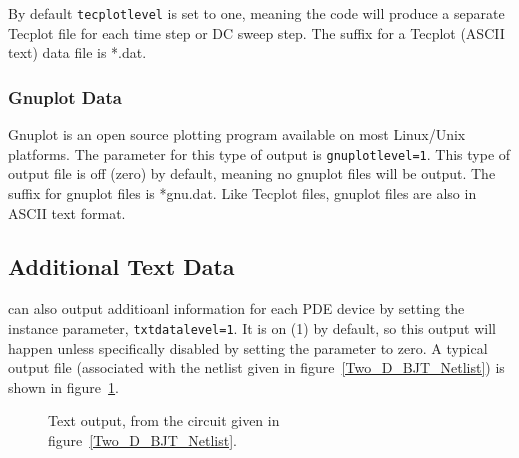 By default \texttt{tecplotlevel} is set to one, meaning the code will produce 
a separate Tecplot file for each time step or DC sweep step.   The
suffix for a Tecplot (ASCII text) data file is *.dat.

\subsubsection{Gnuplot Data}
Gnuplot is an open source plotting program available on most
Linux/Unix platforms.  The parameter for this type of output is 
\texttt{gnuplotlevel=1}.  This type of output file is off (zero) by 
default, meaning no gnuplot files will be output.  The suffix for gnuplot
files is *gnu.dat.  Like Tecplot files, gnuplot files are also in ASCII
text format.

\subsection{Additional Text Data}
\Xyce{} can also output additioanl information for each PDE device by setting 
the instance parameter, \texttt{txtdatalevel=1}.
It is on (1) by default, so this output will happen unless specifically disabled
by setting the parameter to zero.  A typical output file (associated with the
netlist given in figure~\ref{Two_D_BJT_Netlist}) is shown in figure~\ref{txtTwoD}.
\begin{figure}
  \begin{centering}
\caption[Text output]
{Text output, from the circuit given in figure~\ref{Two_D_BJT_Netlist}.\label{txtTwoD}}
\end{centering}
\end{figure}



